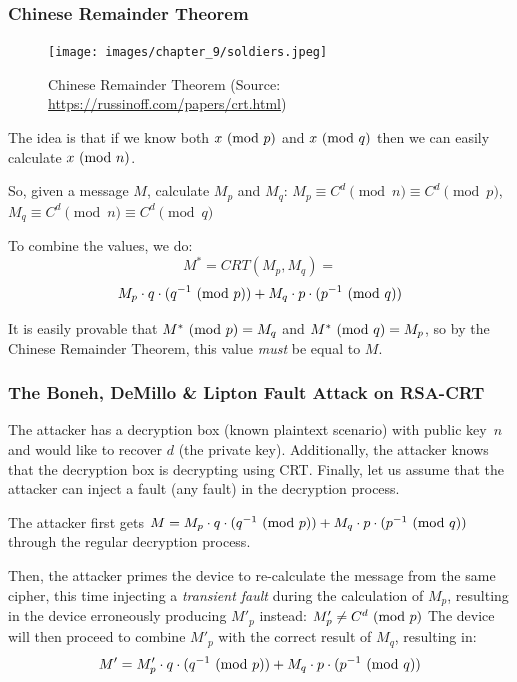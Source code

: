 \subsubsection{Chinese Remainder Theorem}\label{subsubsec:chinese_remainder_theorem}
\begin{figure}[!ht]
	\centering
	\texttt{[image: images/chapter\_9/soldiers.jpeg]}
	\caption{Chinese Remainder Theorem (Source: \url{https://russinoff.com/papers/crt.html})}\label{fig:chinese_remainder}
\end{figure}
The idea is that if we know both $x\ (\mathrm{mod}\ p)$ and $x\ (\mathrm{mod}\ q)$ then we can
easily calculate $x\ (\mathrm{mod}\ n)$.

So, given a message \(M\), calculate \(M_p\) and \(M_q\): \(M_p \equiv C^d
\pmod{n} \equiv C^d \pmod{p}\), \(M_q \equiv C^d \pmod{n} \equiv C^d \pmod{q}\)

To combine the values, we do:
\[M^* = CRT(M_p, M_q) = \]
\[M_p \cdot q \cdot (q^{-1} \ (\mathrm{mod}\ p)) + M_q \cdot p \cdot (p^{-1} \ (\mathrm{mod}\ q))\]

It is easily provable that \(M^* \ (\mathrm{mod}\ p) = M_q\) and \(M^* \ (\mathrm{mod}\ q) = M_p\), so
by the Chinese Remainder Theorem, this value \emph{must} be equal to \(M\).

\subsubsection{The Boneh, DeMillo \& Lipton Fault Attack on RSA-CRT~\cite{boneh}}\label{subsubsec:the_boneh_demillo_lipton_fault_attack_on_rsa_crt}

The attacker has a decryption box (known plaintext scenario) with public key\
\(n\) and would like to recover \(d\) (the private key). Additionally, the
attacker knows that the decryption box is decrypting using CRT\@. Finally, let
us assume that the attacker can inject a fault (any fault) in the decryption
process.

The attacker first gets \(M = M_p\cdot q\cdot (q^{-1} \ (\mathrm{mod}\ p)) + M_q\cdot
p\cdot (p^{-1} \ (\mathrm{mod}\ q))\) through the regular decryption process.

Then, the attacker primes the device to re-calculate the message from the same
cipher, this time injecting a \emph{transient fault} during the calculation of \(M_p\),
resulting in the device erroneously producing \(M'_p\) instead: \(M'_p \neq C^d
\ (\mathrm{mod}\ p)\) The device will then proceed to combine \(M'_p\) with the correct
result of \(M_q\), resulting in:
\[M' =  M'_p \cdot q \cdot (q^{-1} \ (\mathrm{mod}\ p)) + M_q \cdot p \cdot (p^{-1}
\ (\mathrm{mod}\ q))\]

